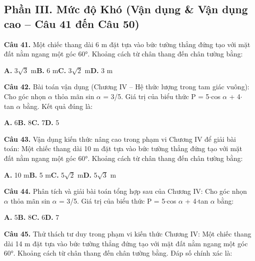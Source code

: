 \documentclass[11pt,a4paper]{article}
\begin{document}
\subsection*{\color{accent} Phần III. Mức độ Khó (Vận dụng \& Vận dụng cao -- Câu 41 đến Câu 50)}
\textbf{\color{primary} Câu 41.} Một chiếc thang dài 6 m đặt tựa vào bức tường thẳng đứng tạo với mặt đất nằm ngang một góc 60°. Khoảng cách từ chân thang đến chân tường bằng:\par
\hspace*{1.5em}\textbf{A.} 3$\sqrt{3}$ m\quad\quad \textbf{B.} 6 m\quad\quad \textbf{C.} 3$\sqrt{2}$ m\quad\quad \textbf{D.} 3 m\par\vspace{2pt}
\textbf{\color{primary} Câu 42.} Bài toán vận dụng (Chương IV – Hệ thức lượng trong tam giác vuông): Cho góc nhọn $\alpha$ thỏa mãn sin $\alpha$ = 3/5. Giá trị của biểu thức P = 5$\cdot$cos $\alpha$ + 4$\cdot$tan $\alpha$ bằng. Kết quả đúng là:\par
\hspace*{1.5em}\textbf{A.} 6\quad\quad \textbf{B.} 8\quad\quad \textbf{C.} 7\quad\quad \textbf{D.} 5\par\vspace{2pt}
\textbf{\color{primary} Câu 43.} Vận dụng kiến thức nâng cao trong phạm vi Chương IV để giải bài toán: Một chiếc thang dài 10 m đặt tựa vào bức tường thẳng đứng tạo với mặt đất nằm ngang một góc 60°. Khoảng cách từ chân thang đến chân tường bằng:\par
\hspace*{1.5em}\textbf{A.} 10 m\quad\quad \textbf{B.} 5 m\quad\quad \textbf{C.} 5$\sqrt{2}$ m\quad\quad \textbf{D.} 5$\sqrt{3}$ m\par\vspace{2pt}
\textbf{\color{primary} Câu 44.} Phân tích và giải bài toán tổng hợp sau của Chương IV: Cho góc nhọn $\alpha$ thỏa mãn sin $\alpha$ = 3/5. Giá trị của biểu thức P = 5$\cdot$cos $\alpha$ + 4$\cdot$tan $\alpha$ bằng:\par
\hspace*{1.5em}\textbf{A.} 5\quad\quad \textbf{B.} 8\quad\quad \textbf{C.} 6\quad\quad \textbf{D.} 7\par\vspace{2pt}
\textbf{\color{primary} Câu 45.} Thử thách tư duy trong phạm vi kiến thức Chương IV: Một chiếc thang dài 14 m đặt tựa vào bức tường thẳng đứng tạo với mặt đất nằm ngang một góc 60°. Khoảng cách từ chân thang đến chân tường bằng. Đáp số chính xác là:\par
\end{document}
